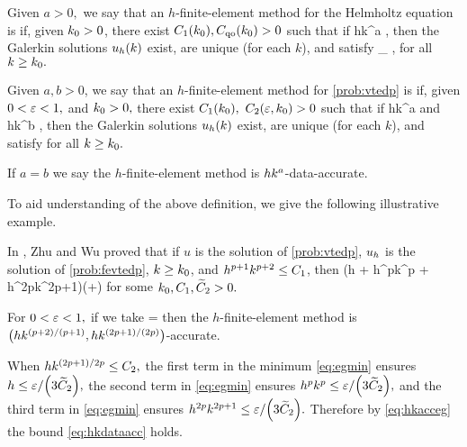 \label{def:hkqo}
Given $a > 0,$ we say that an $h$-finite-element method for the Helmholtz equation is  if, given $k_{0} > 0$, there exist $C_{1}(k_{0}), C_{\mathrm{qo}}(k_{0}) > 0$ such that if
\beqs
hk^{a} \leq \Co,
\eeqs
then the Galerkin solutions $u_{h}(k)$ exist, are unique (for each $k$), and satisfy
\beqs
{} \leq \Cqo \inf_{\vh \in \Vhp} ,
\eeqs
for all $k \geq k_{0}.$
\ede

\label{def:hkdataacc}
Given $a,b>0$, we say that an $h$-finite-element method for \cref{prob:vtedp} is  if, given $0 < \varepsilon < 1,$ and $k_{0} > 0,$ there exist $C_{1}(k_{0}),$ $C_{2}(\varepsilon,k_{0}) > 0$ such that if
\beq\label{eq:hkdataacca}
hk^a \leq \Co
\eeq
and
\beq\label{eq:hkdataaccb}
hk^b \leq \Ct,
\eeq
then the Galerkin solutions $u_{h}(k)$ exist, are unique (for each $k$), and satisfy
\beq\label{eq:hkdataacc}
 \leq \eps \quad \tor \quad {} \leq \eps
\eeq
for all $k \geq k_{0}.$

If $a=b$ we say the $h$-finite-element method is $hk^{a}$-data-accurate.
\ede

To aid understanding of the above definition, we give the following illustrative example.

\label{rem:dataacc}
In \cite[Corollary 4.2]{ZhWu:13}, Zhu and Wu proved that if $u$ is the solution of \cref{prob:vtedp}, $u_{h}$ is the solution of \cref{prob:fevtedp}, $k \geq k_{0}$, and $h^{p+1}k^{p+2} \leq C_{1}$,  then
\beq\label{eq:hkacceg}
 \leq \Cttilde \mleft(h + h^pk^p + h^{2p}k^{2p+1}\mright)\mleft(+\NHhGI{\gI}\mright)
\eeq
for some $k_{0}, C_{1}, \widetilde{C}_{2} > 0.$

For $0 < \varepsilon < 1,$ if we take
\beq\label{eq:egmin}
\Ct = \min{}
\eeq
then the $h$-finite-element method is $\hk{(p+2)/(p+1)}{(2p+1)/(2p)}$-accurate.

When $hk^{(2p+1)/2p} \leq C_{2},$ the first term in the minimum \cref{eq:egmin} ensures $h \leq \eps/\mleft(3\Cttilde\mright),$ the second term in \cref{eq:egmin} ensures $h^pk^p \leq \eps/\mleft(3\Cttilde\mright),$ and the third term in \cref{eq:egmin} ensures $h^{2p}k^{2p+1} \leq \eps/\mleft(3\Cttilde\mright).$ Therefore by \cref{eq:hkacceg} the bound \cref{eq:hkdataacc} holds.

